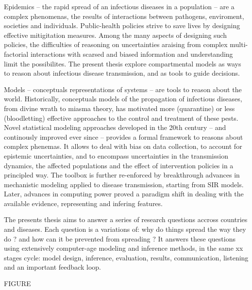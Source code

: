 Epidemics -- the rapid spread of an infectious diseases in a population -- are a complex phenomenas, the results of interactions between pathogens, enviroment, societies and individuals\cite{Buckee:ThinkingClearlySocial:2021, Heesterbeek:ModelingInfectiousDisease:2015,Rinaldo:RiverNetworksEcological:2020a}. Public-health policies strive to save lives by designing effective mitigitation measures. Among the many aspects of designing such policies, the difficulties of reasoning on uncertainties araising from complex multi-factorial interactions with scarsed and biased information and understanding limit the possibilites. The present thesis explore compartmental models as ways to reason about infectious disease transmission, and as tools to guide decisions. 

Models -- conceptuals representations of systems -- are tools to reason about the world. Historically, conceptuals models of the propagation of infectious diseases, from divine wrath to miasma theory, has motivated more (quarantine) or less (bloodletting) effective approaches to the control and treatment of these pests.
Novel statistical modeling approaches\cite{Freedman:AssociationCausationRemarks:1999} developed in the 20th century -- and continously improved ever since\cite{Gelman:WhatAreMost:2021} --  provides a formal framework to reasons about complex phenemas. It allows to deal with bias on data collection, to account for epistemic uncertainties, and to encompass uncertainties in the transmission dynamics, the affected populations and the effect of intervention policies in a principled way. The toolbox is further re-enforced by breakthrough advances in mechanistic modeling applied to disease transmission, starting from SIR models\cite{Kermack:ContributionMathematicalTheory:1927, Anderson:PopulationBiologyInfectious:1979}. Later, advances in computing power proved a paradigm shift in dealing with the available evidence, representing and infering features. 

The presents thesis aims to answer a series of research questions accross countries and diseases. Each question is a variations of: why do things spread the way they do ? and how can it be prevented from spreading ? It answers these questions using extensively computer-age modeling and inference methods, in the same xx stages cycle: model design, inference, evaluation, results, communication, listening and an important feedback loop.

FIGURE

